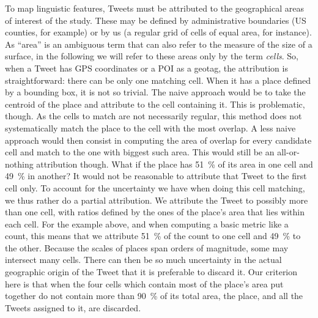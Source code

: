 \documentclass[../thesis.tex]{subfiles}
\begin{document}
To map linguistic features, Tweets must be attributed to the geographical areas of
interest of the study. These may be defined by administrative boundaries (US counties,
for example) or by us (a regular grid of cells of equal area, for instance). As ``area''
is an ambiguous term that can also refer to the measure of the size of a surface, in the
following we will refer to these areas only by the term \emph{cells}. So, when a Tweet
has GPS coordinates or a \ac{POI} as a geotag, the attribution is straightforward: there
can be only one matching cell. When it has a place defined by a bounding box, it is not
so trivial. The naive approach would be to take the centroid of the place and attribute
to the cell containing it. This is problematic, though. As the cells to match are not
necessarily regular, this method does not systematically match the place to the cell
with the most overlap. A less naive approach would then consist in computing the area of
overlap for every candidate cell and match to the one with biggest such area. This would
still be an all-or-nothing attribution though. What if the place has \SI{51}{\percent}
of its area in one cell and \SI{49}{\percent} in another? It would not be reasonable to
attribute that Tweet to the first cell only. To account for the uncertainty we have when
doing this cell matching, we thus rather do a partial attribution. We attribute the
Tweet to possibly more than one cell, with ratios defined by the ones of the place's
area that lies within each cell. For the example above, and when computing a basic
metric like a count, this means that we attribute \SI{51}{\percent} of the count to one
cell and \SI{49}{\percent} to the other. Because the scales of places span orders of
magnitude, some may intersect many cells. There can then be so much uncertainty in the
actual geographic origin of the Tweet that it is preferable to discard it. Our criterion
here is that when the four cells which contain most of the place's area put together do
not contain more than \SI{90}{\percent} of its total area, the place, and all the Tweets
assigned to it, are discarded. 
\end{document}
